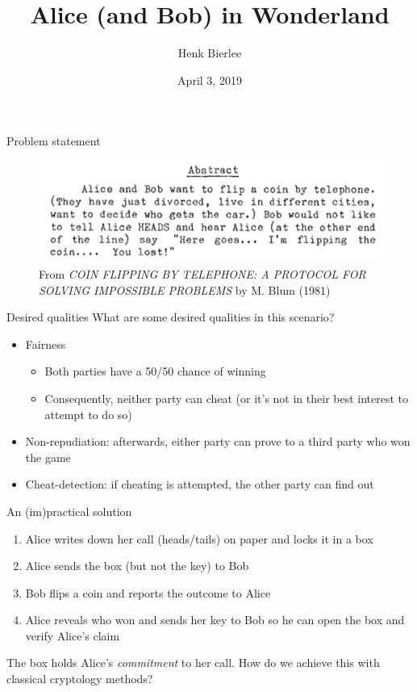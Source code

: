 \documentclass{beamer}
\title{Alice (and Bob) in Wonderland}
\author{Henk Bierlee}
\institute{Uppsala University}
\date{April 3, 2019}
\begin{document}
\frame{\titlepage}

\begin{frame}{Problem statement}

\begin{figure}
    \centering
    \includegraphics{blum-abstract.png}
    \caption{From \emph{COIN FLIPPING BY TELEPHONE: A PROTOCOL FOR SOLVING IMPOSSIBLE PROBLEMS} by M. Blum (1981)}
    \label{fig:blum-abstract}
\end{figure}

\end{frame}

\begin{frame}{Desired qualities}
    What are some desired qualities in this scenario?
    \begin{itemize}
        \item Fairness
        \begin{itemize}
            \item Both parties have a 50/50 chance of winning
            \item Consequently, neither party can cheat (or it's not in their best interest to attempt to do so)
        \end{itemize}
        \item Non-repudiation: afterwards, either party can prove to a third party who won the game
        \item Cheat-detection: if cheating is attempted, the other party can find out
    \end{itemize}

\end{frame}

\begin{frame}{An (im)practical solution}
    \begin{enumerate}
        \item Alice writes down her call (heads/tails) on paper and locks it in a box
        \item Alice sends the box (but not the key) to Bob
        \item Bob flips a coin and reports the outcome to Alice
        \item Alice reveals who won and sends her key to Bob so he can open the box and verify Alice's claim
    \end{enumerate}
    The box holds Alice's \emph{commitment} to her call. How do we achieve this with classical cryptology methods?
\end{frame}
\end{document}
